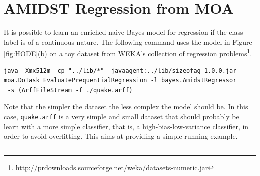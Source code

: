 \section{AMIDST Regression from MOA}

It is possible to learn an enriched naive Bayes model for regression if the class label is of a continuous nature. The following command uses the model in Figure \ref{fig:HODE}(b) on a toy dataset from WEKA's collection of regression problems\footnote{\url{http://prdownloads.sourceforge.net/weka/datasets-numeric.jar}}.

\begin{verbatim}
java -Xmx512m -cp "../lib/*" -javaagent:../lib/sizeofag-1.0.0.jar 
moa.DoTask EvaluatePrequentialRegression -l bayes.AmidstRegressor
 -s (ArffFileStream -f ./quake.arff)
\end{verbatim}

Note that the simpler the dataset the less complex the model should be. In this case, \texttt{quake.arff} is a very simple and small dataset that should probably be learn with a more simple classifier, that is, a high-bias-low-variance classifier, in order to avoid overfitting. This aims at providing a simple running example.






\begin{lstlisting}

\end{lstlisting}